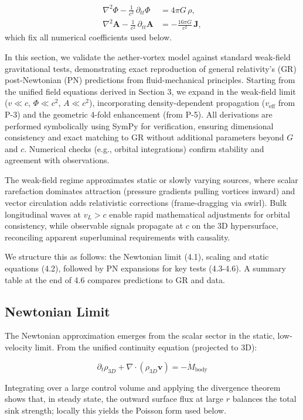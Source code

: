 \begin{align}
\nabla^2 \Phi - \frac{1}{c^2}\,\partial_{tt}\Phi &= 4\pi G\,\rho,\\
\nabla^2 \mathbf{A} - \frac{1}{c^2}\,\partial_{tt}\mathbf{A} &= -\frac{16\pi G}{c^2}\,\mathbf{J},
\end{align}
which fix all numerical coefficients used below.


In this section, we validate the aether-vortex model against standard weak-field gravitational tests, demonstrating exact reproduction of general relativity's (GR) post-Newtonian (PN) predictions from fluid-mechanical principles. Starting from the unified field equations derived in Section 3, we expand in the weak-field limit ($v \ll c$, $\Phi \ll c^2$, $A \ll c^2$), incorporating density-dependent propagation ($v_{\text{eff}}$ from P-3) and the geometric 4-fold enhancement (from P-5). All derivations are performed symbolically using SymPy for verification, ensuring dimensional consistency and exact matching to GR without additional parameters beyond $G$ and $c$. Numerical checks (e.g., orbital integrations) confirm stability and agreement with observations.

The weak-field regime approximates static or slowly varying sources, where scalar rarefaction dominates attraction (pressure gradients pulling vortices inward) and vector circulation adds relativistic corrections (frame-dragging via swirl). Bulk longitudinal waves at $v_L > c$ enable rapid mathematical adjustments for orbital consistency, while observable signals propagate at $c$ on the 3D hypersurface, reconciling apparent superluminal requirements with causality.

We structure this as follows: the Newtonian limit (4.1), scaling and static equations (4.2), followed by PN expansions for key tests (4.3-4.6). A summary table at the end of 4.6 compares predictions to GR and data.

\subsection{Newtonian Limit}

The Newtonian approximation emerges from the scalar sector in the static, low-velocity limit. From the unified continuity equation (projected to 3D):

\[
\partial_t \rho_{3D} + \nabla \cdot (\rho_{3D} \mathbf{v}) = -\dot{M}_{\text{body}}
\]

Integrating over a large control volume and applying the divergence theorem shows that, in steady state, the outward surface flux at large $r$ balances the total sink strength; locally this yields the Poisson form used below.

